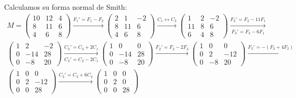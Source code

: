 \documentclass[12pt]{article}
\begin{document}
\begin{ejercicio}
        Calculamos su forma normal de Smith:
        \begin{multline*}
            M=\begin{pmatrix}
                10 & 12 & 4 \\
                8 & 11 & 6 \\
                4 & 6 & 8
            \end{pmatrix}
            \xrightarrow{F_1'=F_1-F_2}
            \begin{pmatrix}
                2 & 1 & -2 \\
                8 & 11 & 6 \\
                4 & 6 & 8
            \end{pmatrix}
            \xrightarrow{C_1 \leftrightarrow C_2}
            \begin{pmatrix}
                1 & 2 & -2 \\
                11 & 8 & 6 \\
                6 & 4 & 8
            \end{pmatrix}
            \xrightarrow[F_3'=F_3-6F_1]{F_2'=F_2-11F_1}\\
            \begin{pmatrix}
                1 & 2 & -2 \\
                0 & -14 & 28 \\
                0 & -8 & 20
            \end{pmatrix}
            \xrightarrow[C_2'=C_2-2C_1]{C_3'=C_3+2C_1}
            \begin{pmatrix}
                1 & 0 & 0\\
                0 & -14 & 28 \\
                0 & -8 & 20
            \end{pmatrix}
            \xrightarrow{F_2'=F_2-2F_3}
            \begin{pmatrix}
                1 & 0 & 0\\
                0 & 2 & -12 \\
                0 & -8 & 20
            \end{pmatrix}
            \xrightarrow{F_3'=-(F_3+4F_2)}\\
            \begin{pmatrix}
                1 & 0 & 0\\
                0 & 2 & -12 \\
                0 & 0 & 28
            \end{pmatrix}
            \xrightarrow{C_3'=C_3+6C_2}
            \begin{pmatrix}
                1 & 0 & 0\\
                0 & 2 & 0 \\
                0 & 0 & 28
            \end{pmatrix}
        \end{multline*}


\end{ejercicio}
\end{document}
